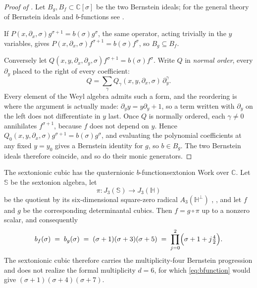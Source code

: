 \documentclass[11pt,letterpaper]{article}
\newcommand{\Cc}{\mathbb{C}}
\begin{document}
\begin{proof}[Proof of ]
Let $B_g,B_f\subset\Cc[\sigma]$ be the two Bernstein ideals; for the general
theory of Bernstein ideals and $b$-functions see \cite[Ch.~1]{Bjork}.

If $P(x,\partial_x,\sigma)g^{\sigma+1}=b(\sigma)g^{\sigma}$, the same operator,
acting trivially in the $y$ variables, gives
$P(x,\partial_x,\sigma)f^{\sigma+1}=b(\sigma)f^{\sigma}$, so $B_g\subseteq B_f$.

Conversely let $Q(x,y,\partial_x,\partial_y,\sigma)f^{\sigma+1}
=b(\sigma)f^{\sigma}$. Write $Q$ in \emph{normal order}, every $\partial_y$
placed to the right of every coefficient:
\begin{equation*}
  Q=\sum_{\gamma}Q_\gamma(x,y,\partial_x,\sigma)\,\partial_y^{\gamma}.
\end{equation*}
Every element of the Weyl algebra admits such a form, and the reordering is
where the argument is actually made: $\partial_yy=y\partial_y+1$, so a term
written with $\partial_y$ on the left does not differentiate in $y$ last. Once $Q$ is normally ordered, each $\gamma\ne0$ annihilates $f^{\sigma+1}$,
because $f$ does not depend on $y$. Hence
$Q_0(x,y,\partial_x,\sigma)g^{\sigma+1}=b(\sigma)g^{\sigma}$, and evaluating the
polynomial coefficients at any fixed $y=y_0$ gives a Bernstein identity for $g$,
so $b\in B_g$. The two Bernstein ideals therefore coincide, and so do their
monic generators.
\end{proof}

\begin{proposition}{The sextonionic cubic has the quaternionic $b$-function}{sextonion}
Work over $\Cc$. Let $\mathbb{S}$ be the sextonion algebra, let
\begin{equation*}
  \pi\colon J_3(\mathbb{S})\longrightarrow J_3(\mathbb{H})
\end{equation*}
be the quotient by its six-dimensional square-zero radical
$A_3(\mathbb{H}^{\perp})$ \cite[Def.~3.1]{Westbury}, \cite[\S8.2]{LM}, and let
$f$ and $g$ be the corresponding determinantal cubics. Then $f=g\circ\pi$ up to a
nonzero scalar, and consequently
\begin{equation}
  b_f(\sigma)\;=\;b_g(\sigma)\;=\;(\sigma+1)(\sigma+3)(\sigma+5)
  \;=\;\prod_{j=0}^{2}\Bigl(\sigma+1+j\tfrac{4}{2}\Bigr).
  \label{eq:bsextonion}
\end{equation}
The sextonionic cubic therefore carries the multiplicity-four Bernstein
progression and does not realize the formal multiplicity $d=6$, for which
\eqref{eq:bfunction} would give $(\sigma+1)(\sigma+4)(\sigma+7)$.
\end{proposition}
\end{document}
